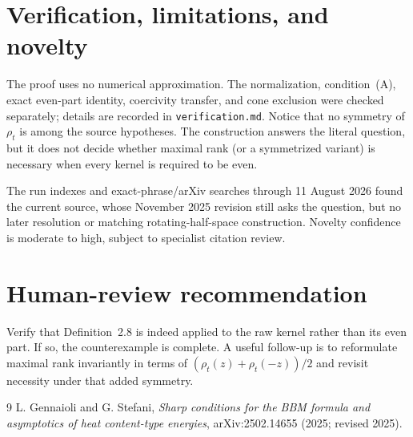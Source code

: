 \documentclass[11pt]{article}
\begin{document}
\section*{Verification, limitations, and novelty}

The proof uses no numerical approximation.  The normalization, condition~(A),
exact even-part identity, coercivity transfer, and cone exclusion were checked
separately; details are recorded in \texttt{verification.md}.  Notice that no
symmetry of $\rho_t$ is among the source hypotheses.  The construction answers
the literal question, but it does not decide whether maximal rank (or a
symmetrized variant) is necessary when every kernel is required to be even.

The run indexes and exact-phrase/arXiv searches through 11 August 2026 found
the current source, whose November 2025 revision still asks the question, but
no later resolution or matching rotating-half-space construction.  Novelty
confidence is moderate to high, subject to specialist citation review.

\section*{Human-review recommendation}

Verify that Definition~2.8 is indeed applied to the raw kernel rather than its
even part.  If so, the counterexample is complete.  A useful follow-up is to
reformulate maximal rank invariantly in terms of
$(\rho_t(z)+\rho_t(-z))/2$ and revisit necessity under that added symmetry.

\begin{thebibliography}{9}
L. Gennaioli and G. Stefani,
\emph{Sharp conditions for the BBM formula and asymptotics of heat
content-type energies}, arXiv:2502.14655 (2025; revised 2025).
\end{thebibliography}
\end{document}
